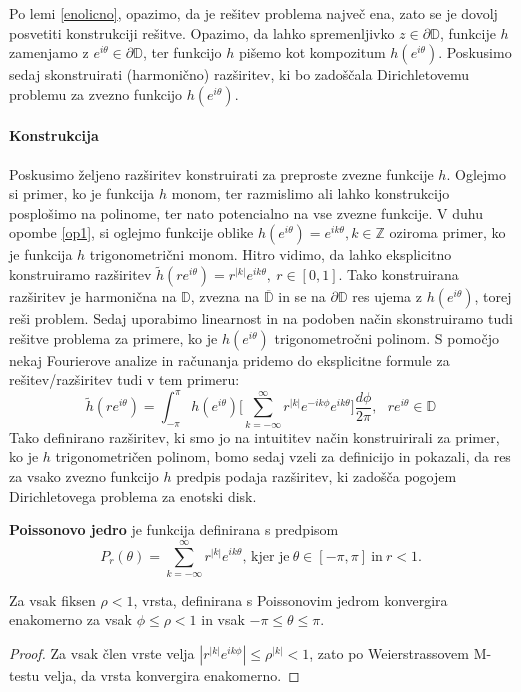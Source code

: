 \documentclass{article}
\begin{document}
    \begin{op}
        \label{op1}
        Po lemi \ref{enolicno}, opazimo, da je rešitev problema največ ena, zato se je dovolj posvetiti konstrukciji rešitve. 
        Opazimo, da lahko spremenljivko $z \in \partial \mathbb{D}$, funkcije $h$ zamenjamo z $e^{i \theta} \in \partial \mathbb{D}$, ter funkcijo $h$ pišemo kot kompozitum $h(e^{i \theta})$.
        Poskusimo sedaj skonstruirati (harmonično) razširitev, ki bo zadoščala Dirichletovemu problemu za zvezno funkcijo $h(e^{i \theta})$.
    \end{op}

    \paragraph[short]{Konstrukcija}
    Poskusimo željeno razširitev konstruirati za preproste zvezne funkcije $h$. Oglejmo si primer, ko je funkcija $h$ monom, ter razmislimo ali lahko konstrukcijo posplošimo na polinome, ter nato potencialno na vse zvezne funkcije. 
    V duhu opombe \ref{op1}, si oglejmo funkcije oblike $h(e^{i \theta}) = e^{i k \theta}, k \in \mathbb{Z}$ oziroma primer, ko je funkcija $h$ trigonometrični monom. Hitro vidimo, da lahko eksplicitno konstruiramo razširitev $\widetilde{h}(r e^{i \theta}) = r^{|k|}e^{i k \theta},~r \in [0, 1]$. 
    Tako konstruirana razširitev je harmonična na $\mathbb{D}$, zvezna na $\overline{\mathbb{D}}$ in se na $\partial \mathbb{D}$ res ujema z $h(e^{i \theta})$, torej reši problem. Sedaj uporabimo linearnost in na podoben način skonstruiramo tudi rešitve problema za primere, ko je $h(e^{i \theta})$ trigonometročni polinom. 
    S pomočjo nekaj Fourierove analize in računanja pridemo do eksplicitne formule za rešitev/razširitev tudi v tem primeru:
    $$
        \widetilde{h}(r e^{i \theta}) = \int_{-\pi}^{\pi}{h(e^{i \theta}) \bigg[\sum_{k = - \infty}^{\infty} r^{|k|} e^{- i k \phi} e^{i k \theta}} \bigg]\frac{d \phi}{2 \pi}, ~~~ r e^{i\theta} \in \mathbb{D}
    $$
    Tako definirano razširitev, ki smo jo na intuititev način konstruirirali za primer, ko je $h$ trigonometričen polinom, bomo sedaj vzeli za definicijo in pokazali, da res za vsako zvezno funkcijo $h$ predpis podaja razširitev, ki zadošča pogojem Dirichletovega problema za enotski disk. 

    \begin{defi}
        \textbf{Poissonovo jedro} je funkcija definirana s predpisom
        $$
           P_r(\theta) = \sum_{k = -\infty}^{\infty}{r^{|k|} e^{i k \theta}}\text{, kjer je}~\theta \in [-\pi, \pi]~\text{in}~ r < 1.
        $$
    \end{defi}
    \begin{trditev}
        Za vsak fiksen $\rho < 1$, vrsta, definirana s Poissonovim jedrom konvergira enakomerno za vsak $\phi \leq \rho < 1$ in vsak $ -\pi \leq \theta \leq \pi$.
    \end{trditev}
    \begin{proof}
        Za vsak člen vrste velja $|r^{|k|} e^{i k \phi}| \leq \rho^{|k|} < 1$, zato po Weierstrassovem M-testu velja, da vrsta konvergira enakomerno.
    \end{proof}
\end{document}
